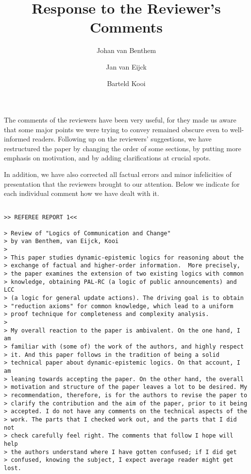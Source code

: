 \documentclass{article}
\title{Response to the Reviewer's Comments}
\author{Johan van Benthem \and Jan van Eijck \and Barteld Kooi}
\begin{document}
\maketitle

The comments of the reviewers have been very useful, for they
made us aware that some major points we were trying to convey
remained obscure even to well-informed readers. Following up
on the reviewers' suggestions, we have restructured the paper
by changing the order of some sections, by putting more emphasis
on motivation, and by adding clarifications at crucial spots.

In addition, we have also corrected all factual errors and
minor infelicities of presentation that the reviewers brought
to our attention. Below we indicate for each individual comment
how we have dealt with it.

\begin{verbatim}

>> REFEREE REPORT 1<<

> Review of "Logics of Communication and Change"
> by van Benthem, van Eijck, Kooi
>
> This paper studies dynamic-epistemic logics for reasoning about the
> exchange of factual and higher-order information.  More precisely,
> the paper examines the extension of two existing logics with common
> knowledge, obtaining PAL-RC (a logic of public announcements) and LCC
> (a logic for general update actions). The driving goal is to obtain
> "reduction axioms" for common knowledge, which lead to a uniform
> proof technique for completeness and complexity analysis.
>
> My overall reaction to the paper is ambivalent. On the one hand, I am
> familiar with (some of) the work of the authors, and highly respect
> it. And this paper follows in the tradition of being a solid
> technical paper about dynamic-epistemic logics. On that account, I am
> leaning towards accepting the paper. On the other hand, the overall
> motivation and structure of the paper leaves a lot to be desired. My
> recommendation, therefore, is for the authors to revise the paper to
> clarify the contribution and the aim of the paper, prior to it being
> accepted. I do not have any comments on the technical aspects of the
> work. The parts that I checked work out, and the parts that I did not
> check carefully feel right. The comments that follow I hope will help
> the authors understand where I have gotten confused; if I did get
> confused, knowing the subject, I expect average reader might get lost.
\end{verbatim} 
\end{document}
